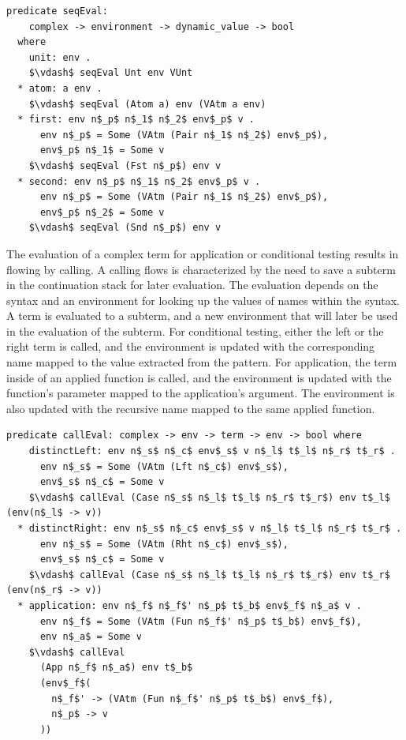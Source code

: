 \documentclass[letterpaper, 11pt]{extarticle}
\begin{document}
\begin{lstlisting}[language=logic, mathescape]
  predicate seqEval:
    complex -> environment -> dynamic_value -> bool 
  where
    unit: env . 
    $\vdash$ seqEval Unt env VUnt
  * atom: a env .
    $\vdash$ seqEval (Atom a) env (VAtm a env)
  * first: env n$_p$ n$_1$ n$_2$ env$_p$ v . 
      env n$_p$ = Some (VAtm (Pair n$_1$ n$_2$) env$_p$),
      env$_p$ n$_1$ = Some v
    $\vdash$ seqEval (Fst n$_p$) env v
  * second: env n$_p$ n$_1$ n$_2$ env$_p$ v . 
      env n$_p$ = Some (VAtm (Pair n$_1$ n$_2$) env$_p$), 
      env$_p$ n$_2$ = Some v 
    $\vdash$ seqEval (Snd n$_p$) env v
\end{lstlisting}

The evaluation of a complex term for application or conditional testing
results in flowing by calling. A calling flows is characterized
by the need to save a subterm in the continuation stack for later evaluation.
The evaluation depends on the syntax
and an environment for looking up the values of names within the syntax.
A term is evaluated to a subterm, and a new environment that will
later be used in the evaluation of the subterm. For conditional testing, either the left or the right
term is called, and the environment is updated with the corresponding name mapped to the
value extracted from the pattern. For application, the term inside of an applied function 
is called, and the environment is updated with the function's parameter mapped to the
application's argument. The environment is also updated with the recursive name mapped to the
same applied function.

\begin{lstlisting}[language=logic, mathescape]
  predicate callEval: complex -> env -> term -> env -> bool where
    distinctLeft: env n$_s$ n$_c$ env$_s$ v n$_l$ t$_l$ n$_r$ t$_r$ .
      env n$_s$ = Some (VAtm (Lft n$_c$) env$_s$),
      env$_s$ n$_c$ = Some v
    $\vdash$ callEval (Case n$_s$ n$_l$ t$_l$ n$_r$ t$_r$) env t$_l$ (env(n$_l$ -> v))
  * distinctRight: env n$_s$ n$_c$ env$_s$ v n$_l$ t$_l$ n$_r$ t$_r$ .
      env n$_s$ = Some (VAtm (Rht n$_c$) env$_s$),
      env$_s$ n$_c$ = Some v
    $\vdash$ callEval (Case n$_s$ n$_l$ t$_l$ n$_r$ t$_r$) env t$_r$ (env(n$_r$ -> v))
  * application: env n$_f$ n$_f$' n$_p$ t$_b$ env$_f$ n$_a$ v .
      env n$_f$ = Some (VAtm (Fun n$_f$' n$_p$ t$_b$) env$_f$),
      env n$_a$ = Some v
    $\vdash$ callEval
      (App n$_f$ n$_a$) env t$_b$
      (env$_f$(
        n$_f$' -> (VAtm (Fun n$_f$' n$_p$ t$_b$) env$_f$),
        n$_p$ -> v
      ))
\end{lstlisting}
  
\end{document}
